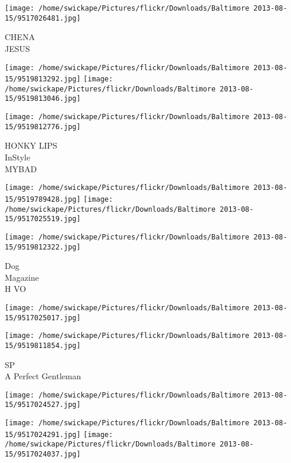 \documentclass[10pt,letterpaper]{article}
\begin{document}
\vspace{0.25in}
\texttt{[image: /home/swickape/Pictures/flickr/Downloads/Baltimore 2013-08-15/9517026481.jpg]}

CHENA\\
JESUS\\
\pagebreak

\texttt{[image: /home/swickape/Pictures/flickr/Downloads/Baltimore 2013-08-15/9519813292.jpg]}
\texttt{[image: /home/swickape/Pictures/flickr/Downloads/Baltimore 2013-08-15/9519813046.jpg]}

\vspace{0.25in}
\texttt{[image: /home/swickape/Pictures/flickr/Downloads/Baltimore 2013-08-15/9519812776.jpg]}

HONKY LIPS\\
InStyle\\
MYBAD\\
\pagebreak

\texttt{[image: /home/swickape/Pictures/flickr/Downloads/Baltimore 2013-08-15/9519789428.jpg]}
\texttt{[image: /home/swickape/Pictures/flickr/Downloads/Baltimore 2013-08-15/9517025519.jpg]}

\texttt{[image: /home/swickape/Pictures/flickr/Downloads/Baltimore 2013-08-15/9519812322.jpg]}

Dog\\
Magazine\\
H VO\\
\pagebreak

\texttt{[image: /home/swickape/Pictures/flickr/Downloads/Baltimore 2013-08-15/9517025017.jpg]}

\vspace{0.25in}
\texttt{[image: /home/swickape/Pictures/flickr/Downloads/Baltimore 2013-08-15/9519811854.jpg]}

SP\\
A Perfect Gentleman\\
\pagebreak

\texttt{[image: /home/swickape/Pictures/flickr/Downloads/Baltimore 2013-08-15/9517024527.jpg]}

\vspace{0.25in}
\texttt{[image: /home/swickape/Pictures/flickr/Downloads/Baltimore 2013-08-15/9517024291.jpg]}
\texttt{[image: /home/swickape/Pictures/flickr/Downloads/Baltimore 2013-08-15/9517024037.jpg]}
\end{document}
